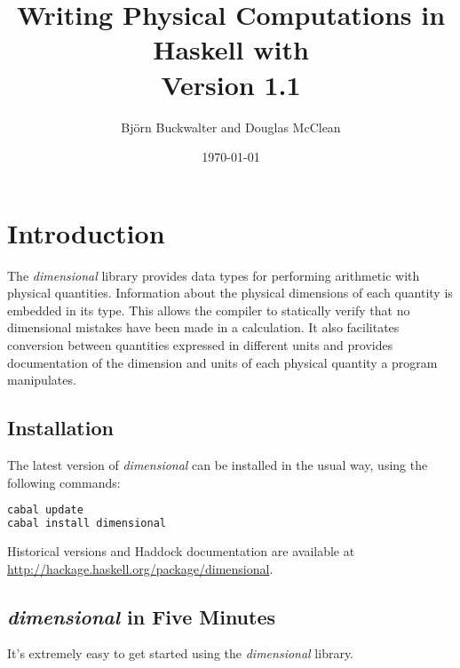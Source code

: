 \documentclass[11pt]{report}
\title{
	{Writing Physical Computations in Haskell with \thispackage}\\
	{\small{Version 1.1}}
}
\author{Björn Buckwalter and Douglas McClean}
\date{\today}
\newcommand{\packagename}[1]{\textit{#1}}
\newcommand{\thispackage}{\packagename{dimensional}}
\begin{document}
\maketitle

\tableofcontents

\chapter{Introduction}

The \thispackage{} library provides data types for performing arithmetic with physical
quantities. Information about the physical dimensions of each quantity is embedded in
its type. This allows the compiler to statically verify that no dimensional mistakes have
been made in a calculation. It also facilitates conversion between quantities expressed
in different units and provides documentation of the dimension and units of each physical
quantity a program manipulates.

\section{Installation}

The latest version of \thispackage{} can be installed in the usual way, using the following commands:

\begin{lstlisting}[language=bash]
cabal update
cabal install dimensional
\end{lstlisting}

Historical versions and Haddock documentation are available at \url{http://hackage.haskell.org/package/dimensional}.


\section{\thispackage{} in Five Minutes}

It's extremely easy to get started using the \thispackage{} library.
\end{document}
